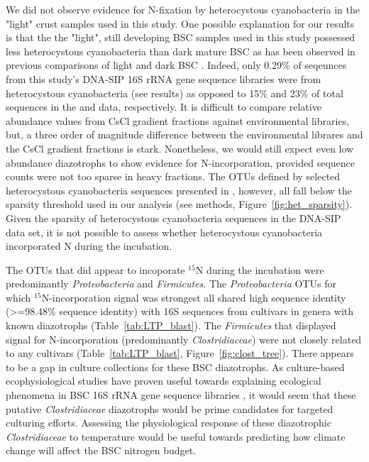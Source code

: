 We did not observe evidence for N-fixation by heterocystous cyanobacteria in
the "light" crust samples used in this study. One possible explanation for our
results is that the the "light", still developing BSC samples used in this
study possessed less heterocystous cyanobacteria than dark mature BSC as has
been observed in previous comparisons of light and dark BSC \citep{14766579}.
Indeed, only 0.29\% of seqeunces from this study's DNA-SIP 16S rRNA gene
sequence libraries were from heterocystous cyanobacteria (see results) as
opposed to 15\% and 23\% of total sequences in the \citet{Steven_2013} and
\citet{Garcia_Pichel_2013} data, respectively. It is difficult to compare
relative abundance values from CsCl gradient fractions against environmental
libraries, but, a three order of magnitude difference between the environmental
librares and the CsCl gradient fractions is stark. Nonetheless, we would still
expect even low abundance diazotrophs to show evidence for N-incorporation,
provided sequence counts were not too sparse in heavy fractions. The OTUs
defined by selected heterocystous cyanobacteria sequences presented in
\citet{Yeager}, however, all fall below the sparsity threshold used in our
analysis (see methods, Figure~\ref{fig:het_sparsity}). Given the sparsity of
heterocystous cyanobacteria sequences in the DNA-SIP data set, it is not
possible to assess whether heterocystous cyanobacteria incorporated N during
the incubation.

The OTUs that did appear to incoporate $^{15}$N during the incubation were
predominantly \textit{Proteobacteria} and \textit{Firmicutes}. The
\textit{Proteobacteria} OTUs for which $^{15}$N-incorporation signal was
strongest all shared high sequence identity (\textgreater=98.48\% sequence
identity) with 16S sequences from cultivars in genera with known diazotrophs
(Table~\ref{tab:LTP_blast}). The
\textit{Firmicutes} that displayed signal for N-incorporation (predominantly
\textit{Clostridiaceae}) were not closely related to any cultivars
(Table~\ref{tab:LTP_blast}, Figure~\ref{fig:clost_tree}). There appears to be a
gap in culture collections for these BSC diazotrophs. As culture-based
ecophysiological studies have proven useful towards explaining ecological
phenomena in BSC 16S rRNA gene sequence libraries \citep{Garcia_Pichel_2013},
it would seem that these putative \textit{Clostridiaceae} diazotrophs would be
prime candidates for targeted culturing efforts. Assessing the physiological
response of these diazotrophic \textit{Clostridiaceae} to temperature would be
useful towards predicting how climate change will affect the BSC nitrogen
budget. 

